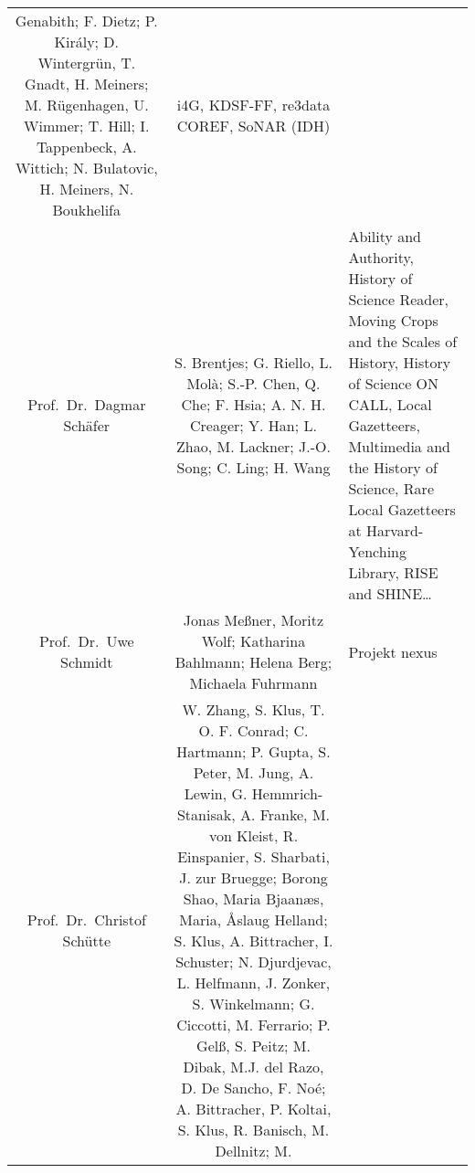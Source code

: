 \documentclass[
]{article}
\begin{document}
\begin{longtable}[]{@{}ccl@{}}
\begin{minipage}[t]{0.37\columnwidth}
Genabith; F. Dietz; P. Király; D. Wintergrün, T. Gnadt, H. Meiners; M.
Rügenhagen, U. Wimmer; T. Hill; I. Tappenbeck, A. Wittich; N. Bulatovic,
H. Meiners, N. Boukhelifa\strut
\end{minipage} & \begin{minipage}[t]{0.37\columnwidth}\raggedright
i4G, KDSF-FF, re3data COREF, SoNAR (IDH)\strut
\end{minipage}\tabularnewline
\begin{minipage}[t]{0.18\columnwidth}\centering
Prof.~Dr.~Dagmar Schäfer\strut
\end{minipage} & \begin{minipage}[t]{0.37\columnwidth}\centering
S. Brentjes; G. Riello, L. Molà; S.-P. Chen, Q. Che; F. Hsia; A. N. H.
Creager; Y. Han; L. Zhao, M. Lackner; J.-O. Song; C. Ling; H. Wang\strut
\end{minipage} & \begin{minipage}[t]{0.37\columnwidth}\raggedright
Ability and Authority, History of Science Reader, Moving Crops and the
Scales of History, History of Science ON CALL, Local Gazetteers,
Multimedia and the History of Science, Rare Local Gazetteers at
Harvard-Yenching Library, RISE and SHINE\ldots{}\strut
\end{minipage}\tabularnewline
\begin{minipage}[t]{0.18\columnwidth}\centering
Prof.~Dr.~Uwe Schmidt\strut
\end{minipage} & \begin{minipage}[t]{0.37\columnwidth}\centering
Jonas Meßner, Moritz Wolf; Katharina Bahlmann; Helena Berg; Michaela
Fuhrmann\strut
\end{minipage} & \begin{minipage}[t]{0.37\columnwidth}\raggedright
Projekt nexus\strut
\end{minipage}\tabularnewline
\begin{minipage}[t]{0.18\columnwidth}\centering
Prof.~Dr.~Christof Schütte\strut
\end{minipage} & \begin{minipage}[t]{0.37\columnwidth}\centering
W. Zhang, S. Klus, T. O. F. Conrad; C. Hartmann; P. Gupta, S. Peter, M.
Jung, A. Lewin, G. Hemmrich-Stanisak, A. Franke, M. von Kleist, R.
Einspanier, S. Sharbati, J. zur Bruegge; Borong Shao, Maria Bjaanæs,
Maria, Åslaug Helland; S. Klus, A. Bittracher, I. Schuster; N.
Djurdjevac, L. Helfmann, J. Zonker, S. Winkelmann; G. Ciccotti, M.
Ferrario; P. Gelß, S. Peitz; M. Dibak, M.J. del Razo, D. De Sancho, F.
Noé; A. Bittracher, P. Koltai, S. Klus, R. Banisch, M. Dellnitz; M.

\end{minipage}
\end{longtable}
\end{document}
